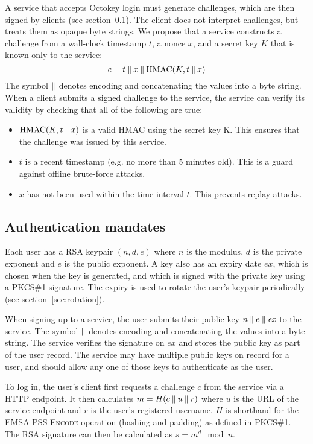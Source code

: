 A service that accepts Octokey login must generate challenges, which are then signed by clients (see
section~\ref{sec:mandates}). The client does not interpret challenges, but treats them as opaque
byte strings. We propose that a service constructs a challenge from a wall-clock timestamp $t$, a
nonce $x$, and a secret key $K$ that is known only to the service:
$$c = t \mathbin{\|} x \mathbin{\|} \mathrm{HMAC}(K, t \mathbin{\|} x)$$
The symbol $\mathbin{\|}$ denotes encoding and concatenating the values into a byte string. When a client
submits a signed challenge to the service, the service can verify its validity by checking that all
of the following are true:
\begin{itemize}
\item $\mathrm{HMAC}(K, t \mathbin{\|} x)$ is a valid HMAC using the secret key K. This ensures that the
challenge was issued by this service.
\item $t$ is a recent timestamp (e.g. no more than 5 minutes old). This is a guard against offline
brute-force attacks.
\item $x$ has not been used within the time interval $t$. This prevents replay attacks.
\end{itemize}

\subsection{Authentication mandates}\label{sec:mandates}

Each user has a RSA keypair $(n, d, e)$ where $n$ is the modulus, $d$ is the private exponent and
$e$ is the public exponent. A key also has an expiry date $\mathit{ex}$, which is chosen when the
key is generated, and which is signed with the private key using a PKCS\#1 signature. The expiry is
used to rotate the user's keypair periodically (see section~\ref{sec:rotation}).

When signing up to a service, the user submits their public key $n \mathbin{\|} e \mathbin{\|} \mathit{ex}$ to
the service. The symbol $\mathbin{\|}$ denotes encoding and concatenating the values into a byte string.
The service verifies the signature on $\mathit{ex}$ and stores the public key as part of the user
record. The service may have multiple public keys on record for a user, and should allow any one of
those keys to authenticate as the user.

To log in, the user's client first requests a challenge $c$ from the service via a HTTP
endpoint. It then calculates $m = H(c \mathbin{\|} u \mathbin{\|} r)$ where $u$ is the URL of the service endpoint and
$r$ is the user's registered username. $H$ is shorthand for the \textsc{EMSA-PSS-Encode} operation
(hashing and padding) as defined in PKCS\#1.~\cite{PKCS1} The RSA signature can then be calculated
as $s = m^d \mod n$.

